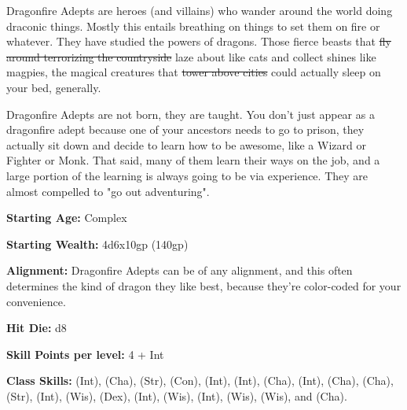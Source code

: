 
Dragonfire Adepts are heroes (and villains) who wander around the world doing draconic things. Mostly this entails breathing on things to set them on fire or whatever. They have studied the powers of dragons. Those fierce beasts that \sout{fly around terrorizing the countryside} laze about like cats and collect shines like magpies, the magical creatures that \sout{tower above cities} could actually sleep on your bed, generally.

Dragonfire Adepts are not born, they are taught. You don't just appear as a dragonfire adept because one of your ancestors needs to go to prison, they actually sit down and decide to learn how to be awesome, like a Wizard or Fighter or Monk. That said, many of them learn their ways on the job, and a large portion of the learning is always going to be via experience. They are almost compelled to "go out adventuring".

\textbf{Starting Age:} Complex

\textbf{Starting Wealth:} 4d6x10gp (140gp)

\textbf{Alignment:} Dragonfire Adepts can be of any alignment, and this often determines the kind of dragon they like best, because they're color-coded for your convenience.

\textbf{Hit Die:} d8

\textbf{Skill Points per level:} 4 + Int

\textbf{Class Skills:}  (Int),  (Cha),  (Str),  (Con),  (Int),  (Int),  (Cha),  (Int),  (Cha),  (Cha),  (Str),  (Int),  (Wis),  (Dex),  (Int),  (Wis),  (Int),  (Wis),  (Wis), and  (Cha).

\modebab{}
\goodfor{}
\poorref{}
\poorwil{}

